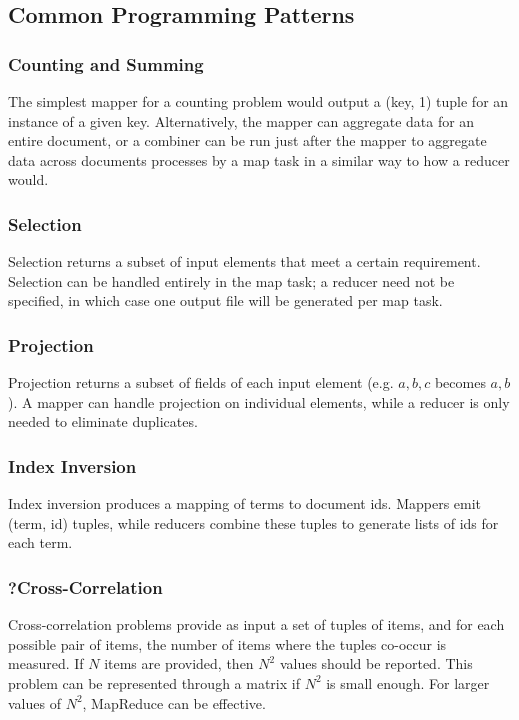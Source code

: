 \documentclass[12pt,titlepage]{article}
\begin{document}
    \subsection{Common Programming Patterns}

      \subsubsection{Counting and Summing}
        The simplest mapper for a counting problem would output a (key, 1) tuple for an instance of a given key. Alternatively, the mapper can aggregate data for an
        entire document, or a combiner can be run just after the mapper to aggregate data across documents processes by a map task in a similar way to how a reducer
        would.

      \subsubsection{Selection}
        Selection returns a subset of input elements that meet a certain requirement. Selection can be handled entirely in the map task; a reducer need not be
        specified, in which case one output file will be generated per map task.

      \subsubsection{Projection}
        Projection returns a subset of fields of each input element (e.g. $a,b,c$ becomes $a,b$). A mapper can handle projection on individual elements, while a
        reducer is only needed to eliminate duplicates.

      \subsubsection{Index Inversion}
        Index inversion produces a mapping of terms to document ids. Mappers emit (term, id) tuples, while reducers combine these tuples to generate lists of ids
        for each term.

      \subsubsection{?Cross-Correlation}
        Cross-correlation problems provide as input a set of tuples of items, and for each possible pair of items, the number of items where the tuples co-occur is
        measured. If $N$ items are provided, then $N^2$ values should be reported. This problem can be represented through a matrix if $N^2$ is small enough.
        For larger values of $N^2$, MapReduce can be effective.
\end{document}
